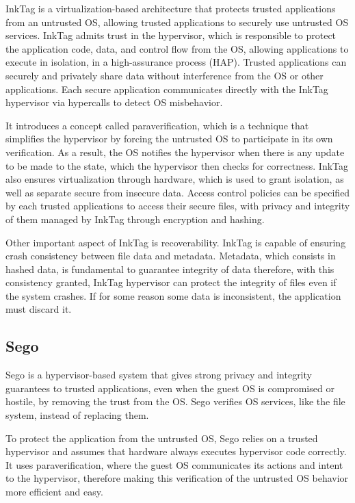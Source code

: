 InkTag \cite{inkTagPaper} is a virtualization-based architecture that protects trusted applications from an untrusted OS, allowing trusted applications to securely use untrusted OS services. InkTag admits trust in the hypervisor, which is responsible to protect the application code, data, and control flow from the OS, allowing applications to execute in isolation, in a high-assurance process (HAP). 
Trusted applications can securely and privately share data without interference from the OS or other applications. Each secure application communicates directly with the InkTag hypervisor via hypercalls to detect OS misbehavior.

It introduces a concept called paraverification, which is a technique that simplifies the hypervisor by forcing the untrusted OS to participate in its own verification. As a result, the OS notifies the hypervisor when there is any update to be made to the state, which the hypervisor then checks for correctness.
InkTag also ensures virtualization through hardware, which is used to grant isolation, as well as separate secure from insecure data.
Access control policies can be specified by each trusted applications to access their secure files, with privacy and integrity of them managed by InkTag through encryption and hashing. 
 
Other important aspect of InkTag is recoverability. InkTag is capable of ensuring crash consistency between file data and metadata. Metadata, which consists in hashed data, is fundamental to guarantee integrity of data therefore, with this consistency granted, InkTag hypervisor can protect the integrity of files even if the system crashes. If for some reason some data is inconsistent, the application must discard it.





\subsection{Sego}

Sego \cite{segoPaper} is a hypervisor-based system that gives strong privacy and integrity guarantees to trusted applications, even when the guest OS is compromised or hostile, by removing the trust from the OS. Sego verifies OS services, like the file system, instead of replacing them.

To protect the application from the untrusted OS, Sego relies on a trusted hypervisor and assumes that hardware always executes hypervisor code correctly.
It uses paraverification, where the guest OS communicates its actions and intent to the hypervisor, therefore making this verification of the untrusted OS behavior more efficient and easy.

